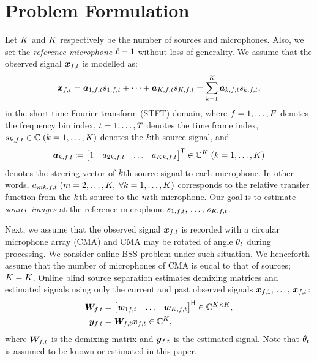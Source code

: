 \documentclass[sip,biber]{now-journal}
\begin{document}
\section{Problem Formulation}\label{sec:problem}
Let $K$ and $\Mic$ respectively be the number of sources and microphones.
Also, we set the \emph{reference microphone} $\ell = 1$ without loss of generality.
We assume that the observed signal $\Obs _{\ft}$ is modelled as:
\begin{equation}
  \Obs _{\ft} = \steer _{1,\ft} \sig _{1,\ft} + \dots + \steer _{\Src,\ft} \sig _{\Src,\ft} = \sum _{\src=1} ^{\Src} \steer _{\src,\ft} \sig _{\src,\ft},\label{eq:mix}
\end{equation}
in the short-time Fourier transform (STFT) domain,
where $f = 1, \dots, F$ denotes the frequency bin index,
$t = 1, \dots, T$ denotes the time frame index,
$\sig _{\src,\ft} \in \C\; (\src = 1, \dots, \Src)$ denotes the $k$th source signal, and
\begin{equation*}
  \steer _{\src,\ft} \coloneqq \begin{bmatrix} 1 & \str _{2\src,\ft} & \dots & \str _{\Mic\src,\ft} \end{bmatrix} ^{\top} \in \C ^{\Mic}\; (\src = 1, \dots, \Src)
\end{equation*}
denotes the steering vector of $k$th source signal to each microphone.
In other words, $\str _{\mic\src,\ft} \; (\mic = 2, \dots, \Mic,\; \forall \src = 1, \dots, \Src)$ corresponds to the relative transfer function from the $k$th source to the $m$th microphone.
Our goal is to estimate \emph{source images} at the reference microphone $\sig _{1,\ft},\, \dots,\, \sig _{\Src,\ft}$.

Next, we assume that the observed signal $\Obs _{\ft}$ is recorded with a circular microphone array (CMA) and CMA may be rotated of angle $\theta _{t}$ during processing.
We consider online BSS problem under such situation.
We henceforth assume that the number of microphones of CMA is euqal to that of sources; $\Mic = \Src$.
\renewcommand{\Mic}{\Src}%
Online blind source separation estimates demixing matrices and estimated signals using only the current and past observed signals $\bm{x} _{f,1},\, \dots,\, \bm{x} _{f,t}$:
\begin{align}
  \Demix _{\ft} &= \begin{bmatrix} \demix _{1\ft} & \dots & \demix _{\Src,\ft} \end{bmatrix} ^{\hermite} \in \C ^{\Src \times \Mic}, \\
  \Est _{\ft} &= \Demix _{\ft} \Obs _{\ft} \in \C ^{\Src},
\end{align}
where $\Demix _{\ft}$ is the demixing matrix and $\Est _{\ft}$ is the estimated signal.
Note that $\theta _{t}$ is assumed to be known or estimated in this paper.
\end{document}
